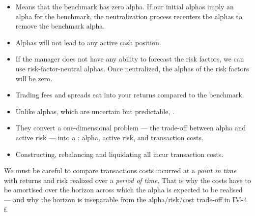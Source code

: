 \begin{itemize}
\item {} Means that the benchmark has zero alpha.
If our initial alphas imply an alpha for the benchmark, the neutralization
process recenters the alphas to remove the benchmark alpha.
\item {} Alphas will not lead to any active cash
position.
\item {} If the manager does not have any ability
to forecast the risk factors, we can use risk-factor-neutral alphas. Once
neutralized, the alphas of the risk factors will be zero.
\end{itemize}


\begin{itemize}
\item Trading fees and spreads eat into your returns compared to the benchmark.
\item Unlike alphas, which are uncertain but predictable, .
\item They convert a one-dimensional problem --- the trade-off between alpha and
active risk --- into a : alpha, active risk, and
transaction costs.
\item Constructing, rebalancing and liquidating all incur transaction costs.
\end{itemize}

\begin{imtrapbox}[breakable=false,title={Costs are a point in time, returns are a period}]
We must be careful to compare transactions costs incurred at a \emph{point in
time} with returns and risk realized over a \emph{period of time}. That is why
the costs have to be amortised over the horizon across which the alpha is
expected to be realised --- and why the horizon is inseparable from the
alpha/risk/cost trade-off in IM-4 f.
\end{imtrapbox}


